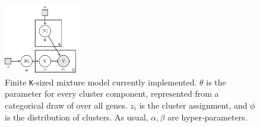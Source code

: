 \documentclass{article}
\begin{document}
\begin{figure}
    \centering
    \includegraphics[width=0.3\textwidth]{figs/mixture}
    \caption{Finite \texttt{K}-sized mixture model currently implemented. $\theta$ is the parameter for every cluster component, represented from a categorical draw of over all genes. $z_i$ is the cluster assignment, and $\phi$ is the distribution of clusters. As usual, $\alpha, \beta$ are hyper-parameters.}
    \label{fig:plate}
\end{figure}
\end{document}
